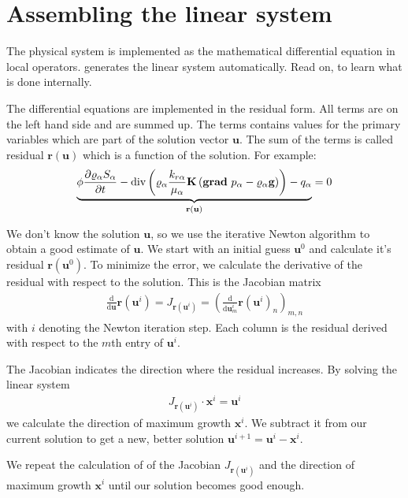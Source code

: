 \section{Assembling the linear system}
\label{sc_linearsystem}
The physical system is implemented as the mathematical differential equation in
local operators. \Dumux generates the linear system automatically. Read on, to
learn what is done internally.

The differential equations are implemented in the residual form. All terms are
on the left hand side and are summed up. The terms contains values for the primary
variables which are part of the solution vector $\textbf{u}$. The sum of the terms
is called residual $\textbf{r}(\textbf{u})$ which is a function of the solution. For
example:
\begin{align*}
\underbrace{
  \phi \frac{\partial \varrho_\alpha S_\alpha}{\partial t}
 -
 \text{div} \left(
 \varrho_\alpha \frac{k_{r\alpha}}{\mu_\alpha} \mbox{\bf K}
 \left(\operatorname{\bf grad}\, p_\alpha - \varrho_{\alpha} \mbox{\bf g} \right)
 \right) - q_\alpha} _
{\textbf{r}(\textbf{u})}
= 0
\end{align*}

We don't know the solution $\textbf{u}$, so we use the iterative Newton algorithm to
obtain a good estimate of $\textbf{u}$. We start with an initial guess $\textbf{u}^0$ and
calculate it's residual $\textbf{r}(\textbf{u}^0)$. To minimize the error, we calculate
the derivative of the residual with respect to the solution. This is the Jacobian
matrix
\begin{align*}
  \frac{\text{d}}{\text{d}\textbf{u}}\textbf{r}(\textbf{u}^i)
  = J_{\textbf{r}(\textbf{u}^i)}
  = \left(\frac{\text{d}}{\text{d}\textbf{u}^i_m}\textbf{r}(\textbf{u}^i)_n\right)_{m,n}
\end{align*}
with $i$ denoting the Newton iteration step.
Each column is the residual derived with respect to the $m$th entry of $\textbf{u}^i$.

The Jacobian indicates the direction where the residual increases. By solving the
linear system
\begin{align*}
  J_{\textbf{r}(\textbf{u}^i)} \cdot \textbf{x}^i = \textbf{u}^i
\end{align*}
we calculate the direction of maximum growth $\textbf{x}^i$. We subtract it from
our current solution to get a new, better solution
$\textbf{u}^{i+1} = \textbf{u}^i - \textbf{x}^i$.

We repeat the calculation of of the Jacobian $J_{\textbf{r}(\textbf{u}^i)}$ and the
direction of maximum growth $\textbf{x}^i$ until our solution becomes good enough.
